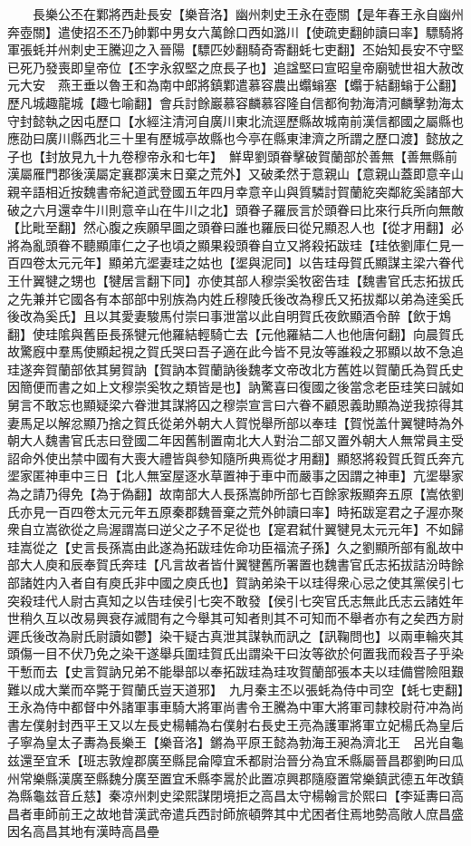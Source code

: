 　　長樂公丕在鄴將西赴長安【樂音洛】幽州刺史王永在壺關【是年春王永自幽州奔壺關】遣使招丕丕乃帥鄴中男女六萬餘口西如潞川【使疏吏翻帥讀曰率】驃騎將軍張蚝并州刺史王騰迎之入晉陽【驃匹妙翻騎奇寄翻蚝七吏翻】丕始知長安不守堅已死乃發喪即皇帝位【丕字永叙堅之庶長子也】追諡堅曰宣昭皇帝廟號世祖大赦改元大安　燕王垂以魯王和為南中郎將鎮鄴遣慕容農出蠮螉塞【蠮于結翻螉于公翻】歷凡城趣龍城【趣七喻翻】會兵討餘巖慕容麟慕容隆自信都徇勃海清河麟擊勃海太守封懿執之因屯歷口【水經注清河自廣川東北流逕歷縣故城南前漢信都國之屬縣也應劭曰廣川縣西北三十里有歷城亭故縣也今亭在縣東津濟之所謂之歷口渡】懿放之子也【封放見九十九卷穆帝永和七年】　鮮卑劉頭眷擊破賀蘭部於善無【善無縣前漢屬雁門郡後漢屬定襄郡漢末日棄之荒外】又破柔然于意親山【意親山蓋即意辛山親辛語相近按魏書帝紀道武登國五年四月幸意辛山與質驎討賀蘭紇突鄰紇奚諸部大破之六月還幸牛川則意辛山在牛川之北】頭眷子羅辰言於頭眷曰比來行兵所向無敵【比毗至翻】然心腹之疾願早圖之頭眷曰誰也羅辰曰從兄顯忍人也【從才用翻】必將為亂頭眷不聽顯庫仁之子也頃之顯果殺頭眷自立又將殺拓跋珪【珪依劉庫仁見一百四卷太元元年】顯弟亢埿妻珪之姑也【埿與泥同】以告珪母賀氏顯謀主梁六眷代王什翼犍之甥也【犍居言翻下同】亦使其部人穆崇奚牧密告珪【魏書官氏志拓拔氏之先兼并它國各有本部部中别族為内姓丘穆陵氏後改為穆氏又拓拔鄰以弟為逹奚氏後改為奚氏】且以其愛妻駿馬付崇曰事泄當以此自明賀氏夜飲顯酒令醉【飲于鴆翻】使珪隂與舊臣長孫犍元他羅結輕騎亡去【元他羅結二人也他唐何翻】向晨賀氏故驚廐中羣馬使顯起視之賀氏哭曰吾子適在此今皆不見汝等誰殺之邪顯以故不急追珪遂奔賀蘭部依其舅賀訥【賀訥本賀蘭訥後魏孝文帝改北方舊姓以賀蘭氏為賀氏史因簡便而書之如上文穆崇奚牧之類皆是也】訥驚喜曰復國之後當念老臣珪笑曰誠如舅言不敢忘也顯疑梁六眷泄其謀將囚之穆崇宣言曰六眷不顧恩義助顯為逆我掠得其妻馬足以解忿顯乃捨之賀氏從弟外朝大人賀悦舉所部以奉珪【賀悦盖什翼犍時為外朝大人魏書官氏志曰登國二年因舊制置南北大人對治二部又置外朝大人無常員主受詔命外使出禁中國有大喪大禮皆與參知隨所典焉從才用翻】顯怒將殺賀氏賀氏奔亢埿家匿神車中三日【北人無室屋逐水草置神于車中而嚴事之因謂之神車】亢埿舉家為之請乃得免【為于偽翻】故南部大人長孫嵩帥所部七百餘家叛顯奔五原【嵩依劉氏亦見一百四卷太元元年五原秦郡魏晉棄之荒外帥讀曰率】時拓跋寔君之子渥亦聚衆自立嵩欲從之烏渥謂嵩曰逆父之子不足從也【寔君弑什翼犍見太元元年】不如歸珪嵩從之【史言長孫嵩由此遂為拓跋珪佐命功臣福流子孫】久之劉顯所部有亂故中部大人庾和辰奉賀氏奔珪【凡言故者皆什翼犍舊所署置也魏書官氏志拓拔詰汾時餘部諸姓内入者自有庾氏非中國之庾氏也】賀訥弟染干以珪得衆心忌之使其黨侯引七突殺珪代人尉古真知之以告珪侯引七突不敢發【侯引七突官氏志無此氏志云諸姓年世稍久互以改易興衰存滅間有之今舉其可知者則其不可知而不舉者亦有之矣西方尉遲氏後改為尉氏尉讀如鬱】染干疑古真泄其謀執而訊之【訊鞠問也】以兩車輪夾其頭傷一目不伏乃免之染干遂舉兵圍珪賀氏出謂染干曰汝等欲於何置我而殺吾子乎染干慙而去【史言賀訥兄弟不能舉部以奉拓跋珪為珪攻賀蘭部張本夫以珪備嘗險阻艱難以成大業而卒斃于賀蘭氏豈天道邪】　九月秦主丕以張蚝為侍中司空【蚝七吏翻】王永為侍中都督中外諸軍事車騎大將軍尚書令王騰為中軍大將軍司隸校尉苻冲為尚書左僕射封西平王又以左長史楊輔為右僕射右長史王亮為護軍將軍立妃楊氏為皇后子寧為皇太子夀為長樂王【樂音洛】鏘為平原王懿為勃海王昶為濟北王　呂光自龜兹還至宜禾【班志敦煌郡廣至縣昆侖障宜禾都尉治晉分為宜禾縣屬晉昌郡劉昫曰瓜州常樂縣漢廣至縣魏分廣至置宜禾縣李暠於此置凉興郡隨廢置常樂鎮武德五年改鎮為縣龜兹音丘慈】秦凉州刺史梁熙謀閉境拒之高昌太守楊翰言於熙曰【李延夀曰高昌者車師前王之故地昔漢武帝遣兵西討師旅頓弊其中尤困者住焉地勢高敞人庶昌盛因名高昌其地有漢時高昌壘